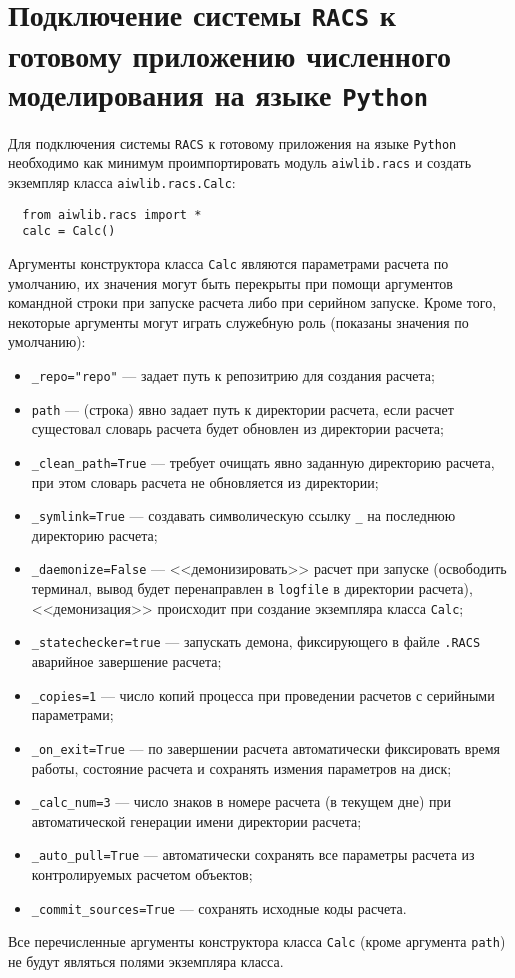 \section{Подключение системы {\tt RACS} к готовому приложению численного моделирования на языке {\tt Python}}
Для подключения системы \verb'RACS' к готовому приложения на языке \verb'Python' необходимо как минимум проимпортировать
модуль \verb'aiwlib.racs' и создать экземпляр класса \verb'aiwlib.racs.Calc':
\begin{verbatim}
  from aiwlib.racs import *
  calc = Calc()
\end{verbatim}
Аргументы конструктора класса \verb'Calc' являются параметрами расчета по умолчанию, их значения могут быть перекрыты при
помощи аргументов командной строки при запуске расчета либо при серийном запуске. Кроме того, некоторые аргументы могут
играть служебную роль (показаны значения по умолчанию):
\begin{itemize}
\item\verb'_repo="repo"' ---  задает путь к репозитрию для создания расчета;
\item\verb'path' --- (строка) явно задает путь к директории расчета, если расчет сущестовал 
  словарь расчета будет обновлен из директории расчета;
\item\verb'_clean_path=True' ---   требует очищать явно заданную директорию расчета, при этом
  словарь расчета не обновляется из директории;
\item\verb'_symlink=True' --- создавать символическую ссылку \verb'_' на последнюю 
  директорию расчета;
\item\verb'_daemonize=False' --- <<демонизировать>> расчет при запуске (освободить терминал, 
  вывод будет перенаправлен в \verb'logfile' в директории расчета),
  <<демонизация>> происходит при создание экземпляра класса \verb'Calc';
\item\verb'_statechecker=true' --- запускать демона, фиксирующего  в файле \verb'.RACS' аварийное
  завершение расчета;
\item\verb'_copies=1' --- число копий процесса при проведении расчетов с серийными 
  параметрами;
\item\verb'_on_exit=True' --- по завершении расчета автоматически фиксировать время работы,
  состояние расчета и сохранять измения параметров на диск;
\item\verb'_calc_num=3' --- число знаков в номере расчета (в текущем дне) при 
  автоматической генерации имени директории расчета;
\item\verb'_auto_pull=True' --- автоматически сохранять все параметры расчета из 
  контролируемых расчетом объектов;
\item\verb'_commit_sources=True' --- сохранять исходные коды расчета.
\end{itemize}
Все перечисленные аргументы конструктора класса \verb'Calc' (кроме аргумента \verb'path') не
будут являться полями экземпляра класса.

